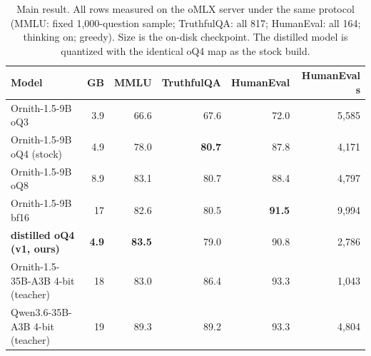 \begin{table}[t]
\centering
\caption{Main result. All rows measured on the oMLX server under the same protocol (MMLU: fixed 1{,}000-question sample; TruthfulQA: all 817; HumanEval: all 164; thinking on; greedy). Size is the on-disk checkpoint. The distilled model is quantized with the identical oQ4 map as the stock build.}
\label{tab:main}
\begin{tabular}{lrrrrr}
\toprule
Model & GB & MMLU & TruthfulQA & HumanEval & HumanEval s \\
\midrule
Ornith-1.5-9B oQ3 & 3.9 & 66.6 & 67.6 & 72.0 & 5,585 \\
Ornith-1.5-9B oQ4 (stock) & 4.9 & 78.0 & \textbf{80.7} & 87.8 & 4,171 \\
Ornith-1.5-9B oQ8 & 8.9 & 83.1 & 80.7 & 88.4 & 4,797 \\
Ornith-1.5-9B bf16 & 17 & 82.6 & 80.5 & \textbf{91.5} & 9,994 \\
\midrule
\textbf{distilled oQ4 (v1, ours)} & \textbf{4.9} & \textbf{83.5} & 79.0 & 90.8 & 2,786 \\
\midrule
Ornith-1.5-35B-A3B 4-bit (teacher) & 18 & 83.0 & 86.4 & 93.3 & 1,043 \\
Qwen3.6-35B-A3B 4-bit (teacher) & 19 & 89.3 & 89.2 & 93.3 & 4,804 \\
\bottomrule
\end{tabular}
\end{table}

